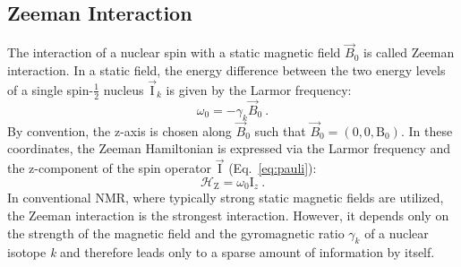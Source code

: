\subsection{Zeeman Interaction}
The interaction of a nuclear spin with a static magnetic field $\vec{B}_0$ is called Zeeman interaction.
In a static field, the energy difference between the two energy levels of a single  spin-$\frac{1}{2}$ nucleus ${\vec{\textrm{I}}}_k$ is given by the Larmor frequency:
\begin{equation}
	\omega_0 = -\gamma_k \vec{B}_0~.
	\label{eq:larmor}
\end{equation}
By convention, the z-axis is chosen along $\vec{B}_0$ such that $\vec{B}_0 = (0,0,\textrm{B}_0)$. In these coordinates, the Zeeman Hamiltonian is expressed via the Larmor frequency and the z\nobreakdash-component of the spin operator ${\vec{\textrm{I}}}$ (Eq.~\ref{eq:pauli}):
\begin{equation}
\mathcal{{H}}_{\textrm{Z}} = \omega_0 {\textrm{I}}_{{z}}~.
\end{equation}
In conventional NMR, where typically strong static magnetic fields are utilized, the Zeeman interaction is the strongest interaction. 
However, it depends only on the strength of the magnetic field and the gyromagnetic ratio $\gamma_k$ of a nuclear isotope \textit{k} and therefore leads only to
a sparse amount of information by itself.
